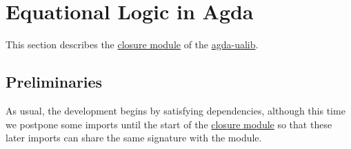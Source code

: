 \documentclass[sigplan,screen]{acmart}
\newcommand\closuremodule{\href{https://gitlab.com/ualib/ualib.gitlab.io/-/blob/master/congruences.lagda.rst}{closure module}\xspace}
\newcommand{\agdaualib}{\href{https://ualib.org}{agda-ualib}\xspace}
\newcommand{\agdaualib}{\href{anonymizedLink/agda-ualib.html}{agda-ualib}\xspace}
\newcommand\closuremodule{\href{anonymizedLink/congruences.lagda.rst}{closure module}\xspace}
\begin{document}
\begin{comment}
The converse of membership-equiv-gives-carrier-equality is obvious.
\begin{code}\end{code}

\subsection{The type of Subalgebras in Agda}\label{the-type-of-subalgebras-in-agda}
Finally, we define, once and for all, the type of subalgebras of an algebra (resp., subalgebras of algebras in a class of algebras) that we will use in the sequel.
\begin{code}\end{code}
\end{comment}


\section{Equational Logic in Agda}\label{equational-logic-in-agda}
This section describes the \closuremodule of the \agdaualib.

\subsection{Preliminaries}\label{preliminaries}
As usual, the development begins by satisfying dependencies, although this time we postpone some imports until the start of the \closuremodule so that these later imports can share the same signature with the module.

\begin{code}
\>[0]\AgdaSymbol{\{-\#}\AgdaSpace{}%
\AgdaSpace{}%
\AgdaSpace{}%
\AgdaSpace{}%
\AgdaSpace{}%
\AgdaSymbol{\#-\}}\<%
\\
%
\\[\AgdaEmptyExtraSkip]%
\>[0]\AgdaSpace{}%
\AgdaSpace{}%
\<%
\\
\>[0]\AgdaSpace{}%
\AgdaSpace{}%
\AgdaSpace{}%
\AgdaSpace{}%
\AgdaSymbol{(}\AgdaSymbol{;}\AgdaSpace{}%
\AgdaSymbol{;}\AgdaSpace{}%
\AgdaSymbol{)}\<%
\end{code}
\end{document}
